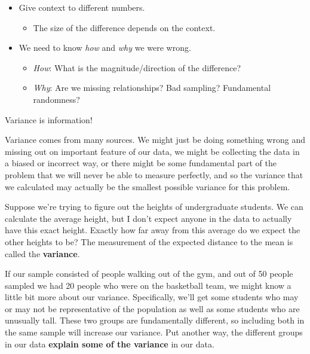 \documentclass[
  letterpaper,
  DIV=11,
  numbers=noendperiod,
  oneside]{scrreprt}
\providecommand{\tightlist}{%
  \setlength{\itemsep}{0pt}\setlength{\parskip}{0pt}}\usepackage{longtable,booktabs,array}
\begin{document}
\begin{itemize}
\tightlist
\item
  Give context to different numbers.

  \begin{itemize}
  \tightlist
  \item
    The size of the difference depends on the context.
  \end{itemize}
\item
  We need to know \emph{how} and \emph{why} we were wrong.

  \begin{itemize}
  \tightlist
  \item
    \emph{How}: What is the magnitude/direction of the difference?
  \item
    \emph{Why}: Are we missing relationships? Bad sampling? Fundamental
    randomness?
  \end{itemize}
\end{itemize}

Variance is information!

Variance comes from many sources. We might just be doing something wrong
and missing out on important feature of our data, we might be collecting
the data in a biased or incorrect way, or there might be some
fundamental part of the problem that we will never be able to measure
perfectly, and so the variance that we calculated may actually be the
smallest possible variance for this problem.

Suppose we're trying to figure out the heights of undergraduate
students. We can calculate the average height, but I don't expect anyone
in the data to actually have this exact height. Exactly how far away
from this average do we expect the other heights to be? The measurement
of the expected distance to the mean is called the
\textbf{variance}.{}

If our sample consisted of people walking out of the gym, and out of 50
people sampled we had 20 people who were on the basketball team, we
might know a little bit more about our variance. Specifically, we'll get
some students who may or may not be representative of the population as
well as some students who are unusually tall. These two groups are
fundamentally different, so including both in the same sample will
increase our variance. Put another way, the different groups in our data
\textbf{explain some of the variance} in our
data.{}
\end{document}
